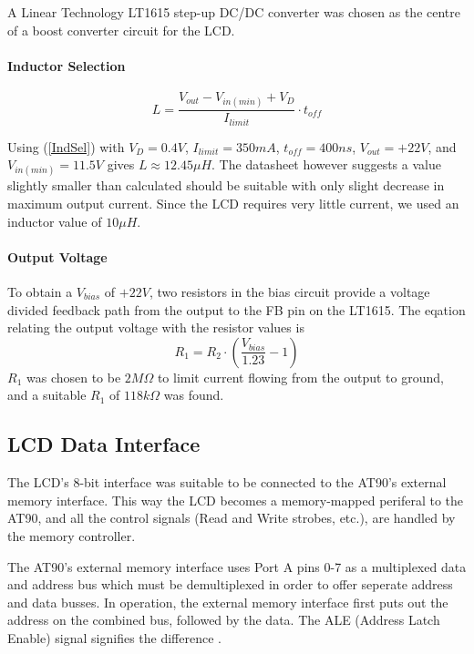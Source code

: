 A Linear Technology LT1615 step-up DC/DC converter was chosen as the
centre of a boost converter circuit for the LCD.


\paragraph{Inductor Selection}

\begin{equation}
L=\frac{V_{out}-V_{in(min)}+V_{D}}{I_{limit}}\cdot t_{off}\label{IndSel}\end{equation}


Using (\ref{IndSel}) with $V_{D}=0.4V$, $I_{limit}=350mA$, $t_{off}=400ns$,
$V_{out}=+22V$, and $V_{in(min)}=11.5V$ gives $L\approx12.45\mu{H}$.
The datasheet however suggests a value slightly smaller than calculated
should be suitable with only slight decrease in maximum output current.
Since the LCD requires very little current, we used an inductor value
of $10\mu H$.


\paragraph{Output Voltage}

To obtain a $V_{bias}$ of $+22V$, two resistors in the bias circuit
provide a voltage divided feedback path from the output to the FB
pin on the LT1615. The eqation relating the output voltage with the
resistor values is \begin{equation}
R_{1}=R_{2}\cdot\left(\frac{V_{bias}}{1.23}-1\right)\end{equation}
 $R_{1}$ was chosen to be $2M\Omega$ to limit current flowing from
the output to ground, and a suitable $R_{1}$ of $118k\Omega$ was
found.


\subsection{LCD Data Interface}

The LCD's 8-bit interface was suitable to be connected to the AT90's
external memory interface. This way the LCD becomes a memory-mapped
periferal to the AT90, and all the control signals (Read and Write
strobes, etc.), are handled by the memory controller.

The AT90's external memory interface uses Port A pins 0-7 as a multiplexed
data and address bus which must be demultiplexed in order to offer
seperate address and data busses. In operation, the external memory
interface first puts out the address on the combined bus, followed
by the data. The ALE (Address Latch Enable) signal signifies the difference
\cite{AT90CAN}.

